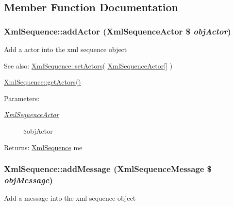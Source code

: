 \subsection{Member Function Documentation}
\hypertarget{class_xml_sequence_4dcdb7d52d39bbdb4b9897c61570a064}{
\subsubsection[{addActor}]{\setlength{\rightskip}{0pt plus 5cm}XmlSequence::addActor ({\bf XmlSequenceActor} \$ {\em objActor})}}
\label{class_xml_sequence_4dcdb7d52d39bbdb4b9897c61570a064}


Add a actor into the xml sequence object

\begin{Desc}
\item[See also:]\hyperlink{class_xml_sequence_00aa28e395a3d00b7b15b1adebe092db}{XmlSequence::setActors}( \hyperlink{class_xml_sequence_actor}{XmlSequenceActor}\mbox{[}\mbox{]} ) 

\hyperlink{class_xml_sequence_dcce8335021177bac08889348f2a508e}{XmlSequence::getActors()} \end{Desc}
\begin{Desc}
\item[Parameters:]
\begin{description}
\item[{\em \hyperlink{class_xml_sequence_actor}{XmlSequenceActor}}]\$objActor \end{description}
\end{Desc}
\begin{Desc}
\item[Returns:]\hyperlink{class_xml_sequence}{XmlSequence} me \end{Desc}
\hypertarget{class_xml_sequence_f46e383dc5728d4b072ac8299417dfed}{
\subsubsection[{addMessage}]{\setlength{\rightskip}{0pt plus 5cm}XmlSequence::addMessage ({\bf XmlSequenceMessage} \$ {\em objMessage})}}
\label{class_xml_sequence_f46e383dc5728d4b072ac8299417dfed}


Add a message into the xml sequence object

